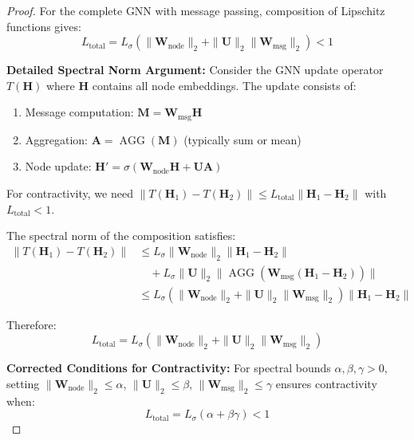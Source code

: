 \documentclass{article}
\begin{document}
\begin{proof}
For the complete GNN with message passing, composition of Lipschitz functions gives:
\begin{equation}
L_{\text{total}} = L_\sigma (\|\mathbf{W}_{\text{node}}\|_2 + \|\mathbf{U}\|_2 \|\mathbf{W}_{\text{msg}}\|_2) < 1
\end{equation}

\textbf{Detailed Spectral Norm Argument:} Consider the GNN update operator $T(\mathbf{H})$ where $\mathbf{H}$ contains all node embeddings. The update consists of:
\begin{enumerate}
\item Message computation: $\mathbf{M} = \mathbf{W}_{\text{msg}} \mathbf{H}$
\item Aggregation: $\mathbf{A} = \operatorname{AGG}(\mathbf{M})$ (typically sum or mean)
\item Node update: $\mathbf{H}' = \sigma(\mathbf{W}_{\text{node}} \mathbf{H} + \mathbf{U} \mathbf{A})$
\end{enumerate}

For contractivity, we need $\|T(\mathbf{H}_1) - T(\mathbf{H}_2)\| \leq L_{\text{total}} \|\mathbf{H}_1 - \mathbf{H}_2\|$ with $L_{\text{total}} < 1$.

The spectral norm of the composition satisfies:
\begin{align}
\|T(\mathbf{H}_1) - T(\mathbf{H}_2)\| &\leq L_\sigma \|\mathbf{W}_{\text{node}}\|_2 \|\mathbf{H}_1 - \mathbf{H}_2\| \\
&\quad + L_\sigma \|\mathbf{U}\|_2 \|\operatorname{AGG}(\mathbf{W}_{\text{msg}}(\mathbf{H}_1 - \mathbf{H}_2))\| \\
&\leq L_\sigma (\|\mathbf{W}_{\text{node}}\|_2 + \|\mathbf{U}\|_2 \|\mathbf{W}_{\text{msg}}\|_2) \|\mathbf{H}_1 - \mathbf{H}_2\|
\end{align}

Therefore:
\begin{equation}
L_{\text{total}} = L_\sigma (\|\mathbf{W}_{\text{node}}\|_2 + \|\mathbf{U}\|_2 \|\mathbf{W}_{\text{msg}}\|_2)
\end{equation}

\textbf{Corrected Conditions for Contractivity:} For spectral bounds $\alpha, \beta, \gamma > 0$, setting $\|\mathbf{W}_{\text{node}}\|_2 \leq \alpha$, $\|\mathbf{U}\|_2 \leq \beta$, $\|\mathbf{W}_{\text{msg}}\|_2 \leq \gamma$ ensures contractivity when:
\begin{equation}
L_{\text{total}} = L_\sigma (\alpha + \beta\gamma) < 1
\end{equation}


\end{proof}
\end{document}
